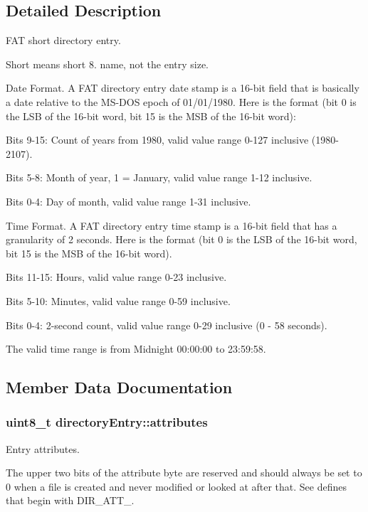 \subsection{Detailed Description}
F\+A\+T short directory entry. 

Short means short 8. name, not the entry size.

Date Format. A F\+A\+T directory entry date stamp is a 16-\/bit field that is basically a date relative to the M\+S-\/\+D\+O\+S epoch of 01/01/1980. Here is the format (bit 0 is the L\+S\+B of the 16-\/bit word, bit 15 is the M\+S\+B of the 16-\/bit word)\+:

Bits 9-\/15\+: Count of years from 1980, valid value range 0-\/127 inclusive (1980-\/2107).

Bits 5-\/8\+: Month of year, 1 = January, valid value range 1-\/12 inclusive.

Bits 0-\/4\+: Day of month, valid value range 1-\/31 inclusive.

Time Format. A F\+A\+T directory entry time stamp is a 16-\/bit field that has a granularity of 2 seconds. Here is the format (bit 0 is the L\+S\+B of the 16-\/bit word, bit 15 is the M\+S\+B of the 16-\/bit word).

Bits 11-\/15\+: Hours, valid value range 0-\/23 inclusive.

Bits 5-\/10\+: Minutes, valid value range 0-\/59 inclusive.

Bits 0-\/4\+: 2-\/second count, valid value range 0-\/29 inclusive (0 -\/ 58 seconds).

The valid time range is from Midnight 00\+:00\+:00 to 23\+:59\+:58. 

\subsection{Member Data Documentation}
\hypertarget{structdirectory_entry_a16c6cde55c8175c90935c386f1cfb21a}{}
\subsubsection[{attributes}]{\setlength{\rightskip}{0pt plus 5cm}uint8\+\_\+t directory\+Entry\+::attributes}\label{structdirectory_entry_a16c6cde55c8175c90935c386f1cfb21a}
Entry attributes.

The upper two bits of the attribute byte are reserved and should always be set to 0 when a file is created and never modified or looked at after that. See defines that begin with D\+I\+R\+\_\+\+A\+T\+T\+\_\+. \hypertarget{structdirectory_entry_a7b43372794655fe6604d3c17c02302fe}{}
